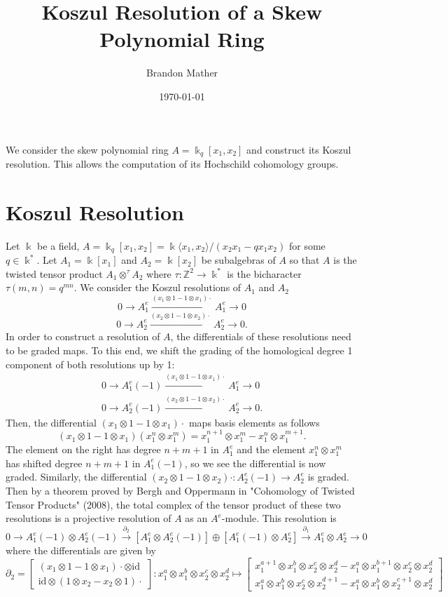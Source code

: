 \documentclass[12pt,a4paper]{article}
\title{Koszul Resolution of a Skew Polynomial Ring}
\author{Brandon Mather}
\date{\today}
\affil{Departments of Mathematics, University of North Texas}
\newcommand\ZZ{\mathbb{Z}}
\newcommand{\kk}{\Bbbk}
\newcommand\1{_{(1)}}
\newcommand\2{_{(2)}}
\begin{document}
\maketitle

We consider the skew polynomial ring $A=\kk_q[x_1,x_2]$ and construct its Koszul resolution. 
This allows the computation of its Hochschild cohomology groups.

\section{Koszul Resolution}

Let $\kk$ be a field, $A=\kk_q[x_1,x_2]=\kk\langle x_1,x_2\rangle/(x_2x_1-qx_1x_2)$ for some $q\in\kk^*$.
Let $A_1=\kk[x_1]$ and $A_2=\kk[x_2]$ be subalgebras of $A$ so that $A$ is the twisted tensor product $A_1\otimes^\tau A_2$ where $\tau:\ZZ^2\to\kk^*$ is the bicharacter $\tau(m,n)= q^{mn}$.
We consider the Koszul resolutions of $A_1$ and $A_2$
\[
  0\to A_1^e\xrightarrow{(x_1\otimes 1-1\otimes x_1)\cdot}A_1^e\to 0
\]
\[
0\to A_2^e\xrightarrow{(x_2\otimes 1-1\otimes x_2)\cdot}A_2^e\to 0.  
\]
In order to construct a resolution of $A$, the differentials of these resolutions need to be graded maps.
To this end, we shift the grading of the homological degree 1 component of both resolutions up by 1:
\begin{align*}
0\to A_1^e(-1)\xrightarrow{(x_1\otimes 1-1\otimes x_1)\cdot}A_1^e\to 0\\
0\to A_2^e(-1)\xrightarrow{(x_2\otimes 1-1\otimes x_2)\cdot}A_2^e\to 0.  
\end{align*}
Then, the differential $(x_1\otimes 1-1\otimes x_1)\cdot$ maps basis elements as follows
\[
(x_1\otimes 1-1\otimes x_1)(x_1^n\otimes x_1^m)=x_1^{n+1}\otimes x_1^m-x_1^n\otimes x_1^{m+1}.
\]
The element on the right has degree $n+m+1$ in $A_1^e$ and the element $x_1^n\otimes x_1^m$ has shifted degree $n+m+1$ in $A_1^e(-1)$, so we see the differential is now graded.
Similarly, the differential $(x_2\otimes 1-1\otimes x_2)\cdot:A_2^e(-1)\to A_2^e$ is graded.
\\

Then by a theorem proved by Bergh and Oppermann in "Cohomology of Twisted Tensor Products" (2008), the total complex of the tensor product of these two resolutions is a projective resolution of $A$ as an $A^e$-module.
This resolution is 
\[
0\to A_1^e(-1)\otimes A_2^e(-1)\xrightarrow{\partial_2}\left[A_1^e\otimes A_2^e(-1)\right]\oplus \left[A_1^e(-1)\otimes A_2^e\right]\xrightarrow{\partial_1}A_1^e\otimes A_2^e\to 0
\]
where the differentials are given by
\[
\partial_2=\begin{bmatrix}(x_1\otimes 1-1\otimes x_1)\cdot\otimes \text{id}\\\text{id}\otimes(1\otimes x_2-x_2\otimes 1)\cdot\end{bmatrix}:x_1^a\otimes x_1^b\otimes x_2^c\otimes x_2^d\mapsto\begin{bmatrix}x_1^{a+1}\otimes x_1^b\otimes x_2^c\otimes x_2^d-x_1^a\otimes x_1^{b+1}\otimes x_2^c\otimes x_2^d\\ x_1^a\otimes x_1^b\otimes x_2^c\otimes x_2^{d+1}-x_1^a\otimes x_1^b\otimes x_2^{c+1}\otimes x_2^d\end{bmatrix}
\]
\end{document}
